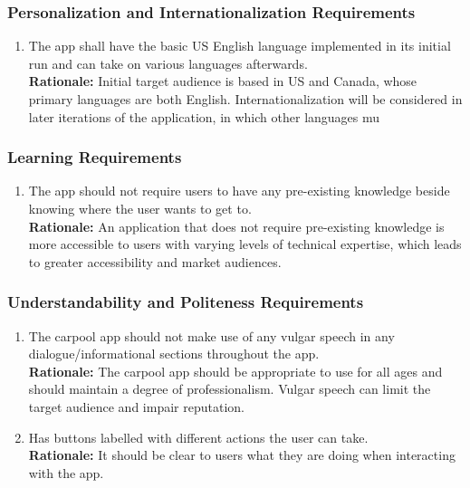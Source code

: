 \documentclass[]{article}
\begin{document}
\subsubsection{Personalization and Internationalization Requirements}
\label{ssub:personalization_and_internationalization_requirements}
\begin{enumerate}[{UH-PI}1. ]
	\item The app shall have the basic US English language implemented in its initial run and can take on various languages afterwards.\\
	{\bf Rationale:} Initial target audience is based in US and Canada, whose primary languages are both English. Internationalization will be considered in later iterations of the application, in which other languages mu
\end{enumerate}

\subsubsection{Learning Requirements}
\label{ssub:learning_requirements}
\begin{enumerate}[{UH-L}1. ]
	\item The app should not require users to have any pre-existing knowledge beside knowing where the user wants to get to.\\
	{\bf Rationale:} An application that does not require pre-existing knowledge is more accessible to users with varying levels of technical expertise, which leads to greater accessibility and market audiences.
\end{enumerate}

\subsubsection{Understandability and Politeness Requirements}
\label{ssub:understandability_and_politeness_requirements}
\begin{enumerate}[{UH-UP}1. ]
	\item The carpool app should not make use of any vulgar speech in any dialogue/informational sections throughout the app.\\
	{\bf Rationale:} The carpool app should be appropriate to use for all ages and should maintain a degree of professionalism. Vulgar speech can limit the target audience and impair reputation.
	\item Has buttons labelled with different actions the user can take.\\
	{\bf Rationale:} It should be clear to users what they are doing when interacting with the app.
\end{enumerate}
\end{document}
